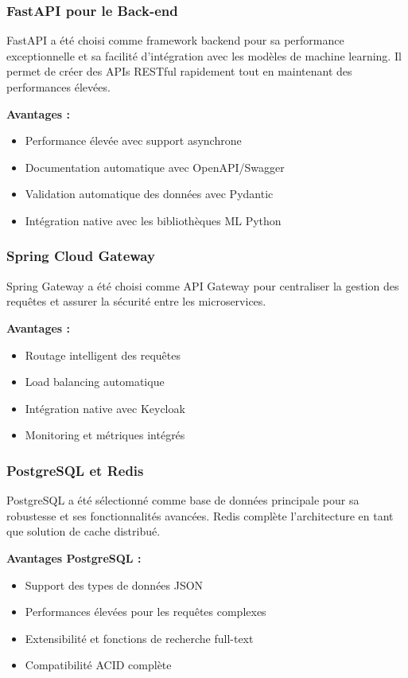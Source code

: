 \subsubsection{FastAPI pour le Back-end}

FastAPI a été choisi comme framework backend pour sa performance exceptionnelle et sa facilité d'intégration avec les modèles de machine learning. Il permet de créer des APIs RESTful rapidement tout en maintenant des performances élevées.

\textbf{Avantages :}
\begin{itemize}
    \item Performance élevée avec support asynchrone
    \item Documentation automatique avec OpenAPI/Swagger
    \item Validation automatique des données avec Pydantic
    \item Intégration native avec les bibliothèques ML Python
\end{itemize}

\subsubsection{Spring Cloud Gateway}

Spring Gateway a été choisi comme API Gateway pour centraliser la gestion des requêtes et assurer la sécurité entre les microservices.

\textbf{Avantages :}
\begin{itemize}
    \item Routage intelligent des requêtes
    \item Load balancing automatique
    \item Intégration native avec Keycloak
    \item Monitoring et métriques intégrés
\end{itemize}

\subsubsection{PostgreSQL et Redis}

PostgreSQL a été sélectionné comme base de données principale pour sa robustesse et ses fonctionnalités avancées. Redis complète l'architecture en tant que solution de cache distribué.

\textbf{Avantages PostgreSQL :}
\begin{itemize}
    \item Support des types de données JSON
    \item Performances élevées pour les requêtes complexes
    \item Extensibilité et fonctions de recherche full-text
    \item Compatibilité ACID complète
\end{itemize}

